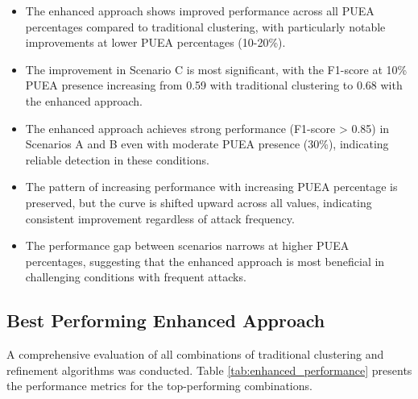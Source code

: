 \begin{itemize}
    \item The enhanced approach shows improved performance across all PUEA percentages compared to traditional clustering, with particularly notable improvements at lower PUEA percentages (10-20\%).
    
    \item The improvement in Scenario C is most significant, with the F1-score at 10\% PUEA presence increasing from 0.59 with traditional clustering to 0.68 with the enhanced approach.
    
    \item The enhanced approach achieves strong performance (F1-score > 0.85) in Scenarios A and B even with moderate PUEA presence (30\%), indicating reliable detection in these conditions.
    
    \item The pattern of increasing performance with increasing PUEA percentage is preserved, but the curve is shifted upward across all values, indicating consistent improvement regardless of attack frequency.
    
    \item The performance gap between scenarios narrows at higher PUEA percentages, suggesting that the enhanced approach is most beneficial in challenging conditions with frequent attacks.
\end{itemize}

\subsection{Best Performing Enhanced Approach}

A comprehensive evaluation of all combinations of traditional clustering and refinement algorithms was conducted. Table \ref{tab:enhanced_performance} presents the performance metrics for the top-performing combinations.


